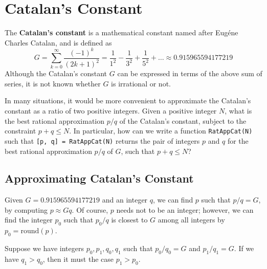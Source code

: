 
\section{Catalan's Constant}

\begin{definition}
	The \textbf{Catalan's constant} is a mathematical constant named after Eug\'ene Charles Catalan, and is defined as
	$$G = \sum_{k=0}^\infty \frac{(-1)^k}{(2k+1)^2} = \frac{1}{1^2} - \frac{1}{3^2} + \frac{1}{5^2} + \dots \approx 0.915965594177219$$
	Although the Catalan's constant $G$ can be expressed in terms of the above sum of series, it is not known whether $G$ is irrational or not.
\end{definition}

\begin{problem}
	In many situations, it would be more convenient to approximate the Catalan's constant as a ratio of two positive integers. Given a positive integer $N$, what is the best rational approximation $p / q$ of the Catalan's constant, subject to the constraint $p + q \leq N$. In particular, how can we write a function \lstinline|RatAppCat(N)| such that \lstinline|[p, q] = RatAppCat(N)| returns the pair of integers $p$ and $q$ for the best rational approximation $p / q$ of $G$, such that $p + q \leq N$?
\end{problem}


\subsection{Approximating Catalan's Constant}
\begin{observation}
	Given $G = 0.915965594177219$ and an integer $q$, we can find $p$ such that $p / q = G$, by computing $p \approx Gq$. Of course, $p$ needs not to be an integer; however, we can find the integer $p_0$ such that $p_0 / q$ is closest to $G$ among all integers by $p_0 = \text{round}(p)$.
\end{observation}

\begin{claim}
	Suppose we have integers $p_0, p_1, q_0, q_1$ such that $p_0 / q_0 = G$ and $p_1 / q_1 = G$. If we have $q_1 > q_0$, then it must the case $p_1 > p_0$.
\end{claim}

